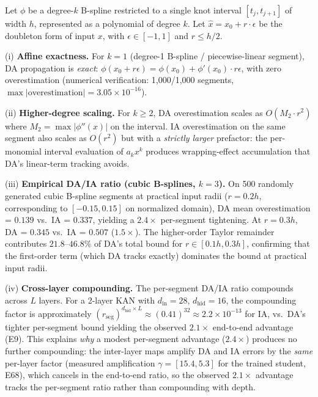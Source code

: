 \vspace{4pt}
\begin{proposition}
\label{prop:da-segment-exactness}
Let $\phi$ be a degree-$k$ B-spline restricted to a single knot interval
$[t_j, t_{j+1}]$ of width $h$, represented as a polynomial of degree
$k$. Let $\hat{x} = x_0 + r \cdot \epsilon$ be the doubleton form of
input $x$, with $\epsilon \in [-1,1]$ and $r \leq h/2$.

\noindent (i) \textbf{Affine exactness.} For $k=1$ (degree-1 B-spline /
piecewise-linear segment), DA propagation is \emph{exact}:
$\phi(x_0 + r\epsilon) = \phi(x_0) + \phi'(x_0) \cdot r\epsilon$, with
zero overestimation (numerical verification: 1{,}000/1{,}000 segments,
$\max |\text{overestimation}| = 3.05 \times 10^{-16}$).

\noindent (ii) \textbf{Higher-degree scaling.} For $k \geq 2$, DA
overestimation scales as $O(M_2 \cdot r^2)$ where $M_2 = \max |\phi''(x)|$
on the interval. IA overestimation on the same segment also scales as
$O(r^2)$ but with a \emph{strictly larger} prefactor: the per-monomial
interval evaluation of $a_k x^k$ produces wrapping-effect accumulation
that DA's linear-term tracking avoids.

\noindent (iii) \textbf{Empirical DA/IA ratio (cubic B-splines, $k=3$).}
On 500 randomly generated cubic B-spline segments at practical input
radii ($r = 0.2h$, corresponding to $[-0.15, 0.15]$ on normalized
domain), DA mean overestimation = $0.139$ vs.\ IA = $0.337$, yielding a
$2.4\times$ per-segment tightening. At $r = 0.3h$, DA = $0.345$ vs.\
IA = $0.507$ ($1.5\times$). The higher-order Taylor remainder
contributes $21.8$--$46.8\%$ of DA's total bound for $r \in [0.1h, 0.3h]$,
confirming that the first-order term (which DA tracks exactly) dominates
the bound at practical input radii.

\noindent (iv) \textbf{Cross-layer compounding.} The per-segment DA/IA
ratio compounds across $L$ layers. For a 2-layer KAN with $d_{\text{in}}=28$,
$d_{\text{hid}}=16$, the compounding factor is approximately
$(r_{\text{seg}})^{d_{\text{hid}} \times L} \approx (0.41)^{32} \approx
2.2 \times 10^{-13}$ for IA, vs.\ DA's tighter per-segment bound
yielding the observed $2.1\times$ end-to-end advantage (E9). This
explains \emph{why} a modest per-segment advantage ($2.4\times$) produces
no further compounding: the inter-layer maps amplify DA and IA errors by
the \emph{same} per-layer factor (measured amplification
$\gamma = [15.4, 5.3]$ for the trained student, E68), which cancels in
the end-to-end ratio, so the observed $2.1\times$ advantage tracks the
per-segment ratio rather than compounding with depth.
\end{proposition}

